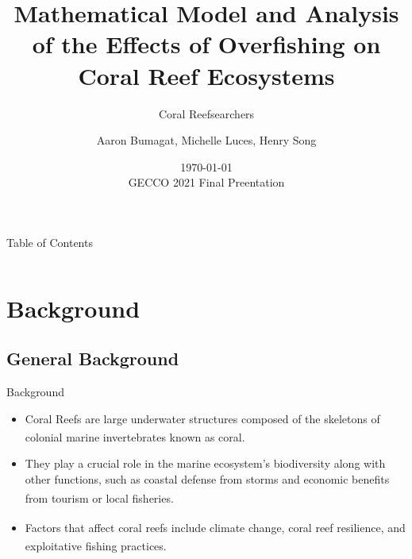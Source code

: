 \documentclass{beamer}
\title[]{Mathematical Model and Analysis of the Effects of Overfishing on Coral Reef Ecosystems}
\subtitle{Coral Reefsearchers}
\author{Aaron Bumagat, Michelle Luces, Henry Song }
\institute{University of Guam}
\date{\today\\GECCO 2021 Final Preentation}
\begin{document}
\frame{\titlepage}

\AtBeginSection[]{
    \begin{frame}{}
        \frametitle{}
        \setcounter{tocdepth}{2}
        \tableofcontents[currentsection, sections = \thesection]
        \setcounter{tocdepth}{1}
    \end{frame}
}

\begin{frame}{Table of Contents}
    \begin{columns}
        \begin{column}{0.5\textwidth}
            \tableofcontents[sections=1-2]
        \end{column}
        \begin{column}{0.5\textwidth}
            \tableofcontents[sections=3-5]
        \end{column}
    \end{columns}
\end{frame}


\section{Background}
\subsection{General Background}
\begin{frame}{Background}
    \begin{itemize}
        \item<1-> Coral Reefs are large underwater structures composed of the skeletons of colonial marine invertebrates known as coral\textsuperscript{\cite{ross}}.
         \item<2-> They play a crucial role in the marine ecosystem's biodiversity along with other functions, such as coastal defense from storms and economic benefits from tourism or local fisheries\textsuperscript{\cite{04_mathanalysis}}.
         \item<3-> Factors that affect coral reefs include climate change, coral reef resilience\textsuperscript{\cite{02_Riegl_Purkis_Model}}, and exploitative fishing practices\textsuperscript{\cite{05_quintero_machuca_cotto_bradley_ríos-soto_2016}}.
    \end{itemize}
\end{frame}
\end{document}
